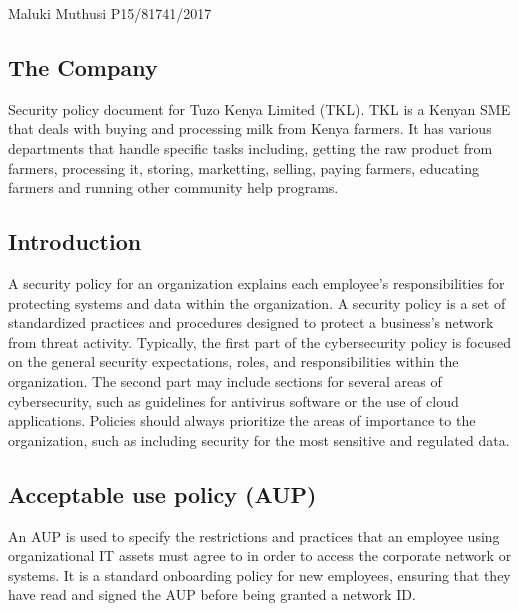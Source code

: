 \documentclass{article}
\author{Maluki Muthusi}
\begin{document}
Maluki Muthusi P15/81741/2017

\subsection{The Company}
Security policy document for Tuzo Kenya Limited (TKL). TKL is a Kenyan SME that deals with buying and processing milk from Kenya farmers. It has various departments that handle specific tasks including, getting the raw product from farmers, processing it, storing, marketting, selling, paying farmers, educating farmers and running other community help programs.

\subsection*{Introduction}
A security policy for an organization explains each employee’s responsibilities for protecting systems and data within the organization. A security policy is a set of standardized practices and procedures designed to protect a business’s network from threat activity. Typically, the first part of the cybersecurity policy is focused on the general security expectations, roles, and responsibilities within the organization. The second part may include sections for several areas of cybersecurity, such as guidelines for antivirus software or the use of cloud applications. Policies should always prioritize the areas of importance to the organization, such as including security for the most sensitive and regulated data.


\subsection*{Acceptable use policy (AUP)}
An AUP is used to specify the restrictions and practices that an employee using organizational IT assets must agree to in order to access the corporate network or systems. It is a standard onboarding policy for new employees, ensuring that they have read and signed the AUP before being granted a network ID. \citep{uap}
\end{document}
